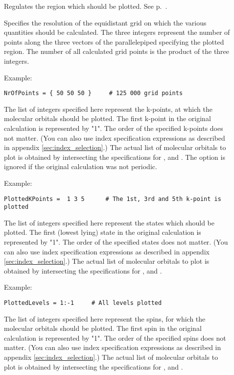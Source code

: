 \begin{description}
\item[] Regulates the region which should be
  plotted. See p.~.
\item[] Specifies the resolution of the equidistant grid on
  which the various quantities should be calculated. The three
  integers represent the number of points along the three vectors of
  the parallelepiped specifying the plotted region. The number of all
  calculated grid points is the product of the three integers.

Example:
\begin{verbatim}
NrOfPoints = { 50 50 50 }     # 125 000 grid points
\end{verbatim}

\item[] The list of integers specified here represent the k-points, at which the
  molecular orbitals should be plotted. The first k-point in the original \dftbp{} calculation is
  represented by "1". The order of the specified k-points does not matter. (You can also use
  index specification expressions as described in appendix \ref{sec:index_selection}.) The actual
  list of molecular orbitals to plot is obtained by intersecting the specifications for
  ,  and .  The option is ignored if the
  original calculation was not periodic.

Example:
\begin{verbatim}
PlottedKPoints =  1 3 5      # The 1st, 3rd and 5th k-point is plotted
\end{verbatim}

\item[] The list of integers specified here represent the states which should be
  plotted. The first (lowest lying) state in the original \dftbp{} calculation is represented by
  "1". The order of the specified states does not matter. (You can also use  index specification
  expressions as described in appendix \ref{sec:index_selection}.)  The actual list of molecular
  orbitals to plot is obtained by intersecting the specifications for ,
   and .

Example:
\begin{verbatim}
PlottedLevels = 1:-1     # All levels plotted
\end{verbatim}

\item[] The list of integers specified here represent the spins, for which the
  molecular orbitals should be plotted. The first spin in the original \dftbp{} calculation is
  represented by "1". The order of the specified spins does not matter. (You can also use index
  specification expressions as described in appendix \ref{sec:index_selection}.) The actual list of
  molecular orbitals to plot is obtained by intersecting the specifications for ,
   and .


\end{description}
